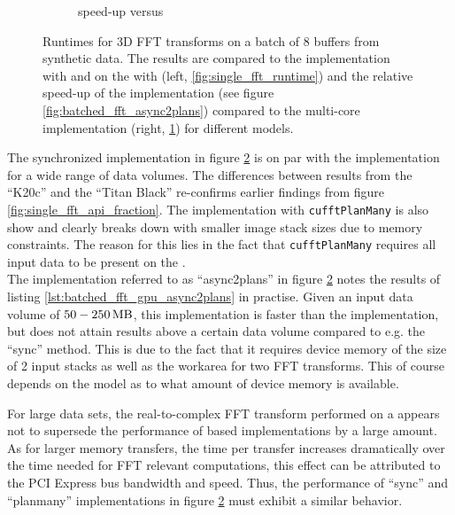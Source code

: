 \begin{figure}[h]
\begin{subfigure}[b]{0.45\textwidth}
    \caption{\gpu{} speed-up versus \cpu{}}
    \label{fig:batched_fft_speed_up}
  \end{subfigure}
  \hfill
  \caption{Runtimes for 3D FFT transforms on a batch of 8 buffers from synthetic data. The results are compared to the \cpu{} implementation with \fftw{} and on the \gpu{} with \cufft{} (left, \ref{fig:single_fft_runtime}) and the relative speed-up of the \gpu{} implementation (see figure \ref{fig:batched_fft_async2plans}) compared to the multi-core \cpu{} implementation (right, \ref{fig:batched_fft_speed_up}) for different \gpu{} models.}
  \label{fig:rt_batched_fft}
\end{figure}


The synchronized implementation in figure \ref{fig:rt_batched_fft} is on par with the \cpu{} implementation for a wide range of data volumes. The differences between results from the ``K20c'' and the ``Titan Black'' \gpu{} re-confirms earlier findings from figure \ref{fig:single_fft_api_fraction}. The implementation with \texttt{cufftPlanMany} is also show and clearly breaks down with smaller image stack sizes due to \gpu{} memory constraints. The reason for this lies in the fact that \texttt{cufftPlanMany} requires all input data to be present on the \gpu{}.\\
 
The implementation referred to as ``async2plans'' in figure \ref{fig:rt_batched_fft} notes the results of listing \ref{lst:batched_fft_gpu_async2plans} in practise. Given an input data volume of $\unit[50-250]{MB}$, this implementation is faster than the \cpu{} implementation, but does not attain results above a certain data volume compared to e.g. the ``sync'' method. This is due to the fact that it requires device memory of the size of 2 input stacks as well as the workarea for two FFT transforms. This of course depends on the \gpu{} model as to what amount of device memory is available. %
\newline

For large data sets, the real-to-complex FFT transform performed on a \gpu{} appears not to supersede the performance of \cpu{} based implementations by a large amount. As for larger memory transfers, the time per transfer increases dramatically over the time needed for FFT relevant computations, this effect can be attributed to the PCI Express bus bandwidth and speed. Thus, the performance of ``sync'' and ``planmany'' implementations in figure \ref{fig:rt_batched_fft} must exhibit a similar behavior.

